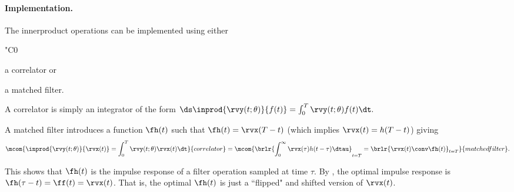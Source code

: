 \paragraph{Implementation.}
The innerproduct operations can be implemented using either
  \begin{dingautolist}{"C0}
     \item a correlator or
     \item a matched filter.
  \end{dingautolist}

A correlator is simply an integrator of the form
   $\ds\inprod{\rvy(t;\theta)}{f(t)} = \int_0^T \rvy(t;\theta)f(t)\dt.$

A matched filter introduces a function $\fh(t)$ such that
$\fh(t) =\rvx(T-t)$ (which implies $\rvx(t)=h(T-t)$) giving
  \[
    \mcom{\inprod{\rvy(t;\theta)}{\rvx(t)} = \int_0^T \rvy(t;\theta)\rvx(t)\dt }
         {correlator}
    =
    \mcom{\brlr{\int_0^\infty \rvx(\tau)h(t-\tau)\dtau}_{t=T}
            = \brlr{\rvx(t)\conv \fh(t)}_{t=T}
         }{matched filter}.
  \]

This shows that $\fh(t)$ is the impulse response of a filter operation
sampled at time $\tau$. %
By , the optimal impulse response is
$\fh(\tau-t)=\ff(t)=\rvx(t)$.
That is, the optimal $\fh(t)$ is just a ``flipped" and shifted version of $\rvx(t)$.




